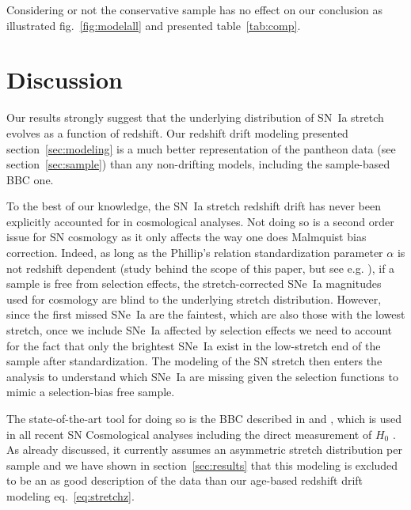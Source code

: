 \documentclass[]{aa} %
\newcommand{\mr}[1]{{\textcolor[rgb]{0.60,0.10,0.6}{#1}}}
\begin{document}
\mr{Considering or not the conservative sample has no effect on our conclusion
as illustrated fig.~\ref{fig:modelall} and presented table~\ref{tab:comp}.}

\section{Discussion}
\label{sec:bbc}
\mr{Our results strongly suggest that the underlying distribution of SN~Ia
stretch evolves as a function of redshift. Our redshift drift modeling presented
section~\ref{sec:modeling} is a much better representation of the pantheon data
(see section~\ref{sec:sample}) than any non-drifting models, including the
sample-based BBC one.}

\mr{To the best of our knowledge, the SN~Ia stretch redshift drift has never
    been explicitly accounted for in cosmological analyses. Not doing so is a
    second order issue for SN cosmology as it only affects the way one does
    Malmquist bias correction. Indeed, as long as the Phillip's relation
    standardization parameter $\alpha$ is not redshift dependent (study behind
    the scope of this paper, but see e.g. \citealt{scolnic2018a}), if a sample
    is free from selection effects, the stretch-corrected SNe~Ia magnitudes used
    for cosmology are blind to the underlying stretch distribution.  However,
    since the first missed SNe~Ia are the faintest, which are also those with
    the lowest stretch, once we include SNe~Ia affected by selection effects we
    need to account for the fact that only the brightest SNe~Ia exist in the
    low-stretch end of the sample after standardization.  The modeling of the SN
stretch then enters the analysis to understand which SNe~Ia are missing given
the selection functions to mimic a selection-bias free sample.}

\mr{The state-of-the-art tool for doing so is the BBC described in
\cite{scolnic2016} and \cite{kessler2017}, which is used in all recent SN
Cosmological analyses
\citep{jones2018b,scolnic2018a,brout2019,descosmopaper2019} including the direct
measurement of $H_0$ \citep{riess2016,riess2019}. As already discussed, it
currently assumes an asymmetric stretch distribution per sample and we have
shown in section~\ref{sec:results} that this modeling is excluded to be an as
good description of the data than our age-based redshift drift modeling
eq.~\ref{eq:stretchz}.}
\end{document}
